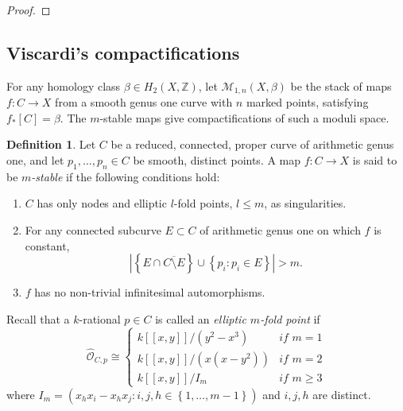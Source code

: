 \documentclass[11pt]{amsart}
\newcommand{\PP}{\mathbb P}
\renewcommand{\to}{\rightarrow}
\newcommand{\bcd}{\begin{center}\begin{tikzcd}}
\newcommand{\ecd}{\end{tikzcd}\end{center}}
\theoremstyle{plain}
\theoremstyle{definition}
\newtheorem{dfn}[thm]{Definition}
\begin{document}
\begin{proof}

 \end{proof}

\subsection{Viscardi's compactifications}
For any homology class $\beta\in H_2(X,\mathbb Z)$, let $\mathcal M_{1,n}(X,\beta)$ be the stack of maps $f\colon C\to X$ from a smooth genus one curve with $n$ marked points, satisfying  $f_{*}\left [C\right ]=\beta$. The $m$-stable maps give compactifications of such a moduli space.
  \begin{dfn} Let $C$ be a reduced, connected, proper curve of arithmetic genus one, and let $p_1,\dots,p_n\in C$ be smooth, distinct points. A map $f\colon C\to X$ is said to be \emph{$m$-stable} if the following conditions hold:
\begin{enumerate}
 \item $C$ has only nodes and elliptic $l$-fold points, $l\leq m$, as singularities.
 \item For any connected subcurve $E\subset C$ of arithmetic genus one on which $f$ is constant, 
 \[|\left\{E\cap \overline{C\setminus E}\right\}\cup\left\{p_i : p_i \in E\right\}| > m.\]
 \item $f$ has no non-trivial infinitesimal automorphisms.
 \end{enumerate}
\end{dfn}
Recall that a $k$-rational $p\in C$ is called an \emph{elliptic $m$-fold point} if 
\[
\hat{\mathcal{O}}_{C,p}\cong
\begin{cases}
k[[x,y]]/(y^2-x^3) & \textit{if } m=1\\
k[[x,y]]/(x(x-y^2))& \textit{if } m=2\\
k[[x,y]]/ I_m & \textit{if } m\geq 3
\end{cases}
\] 
where $I_m=(x_hx_i-x_hx_j : i,j,h\in\left\{1,\dots,m-1\right\})$ and $i,j,h$ are distinct.
\end{document}
